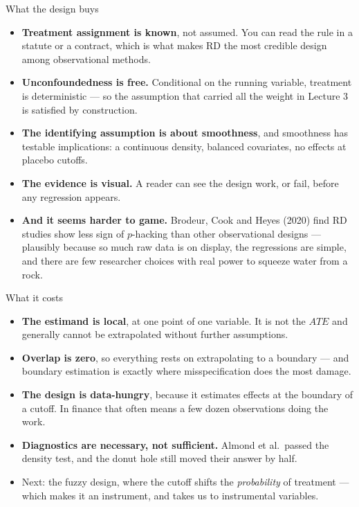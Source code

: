 \documentclass[
  11pt,
  ignorenonframetext,
  aspectratio=169,
]{beamer}
\providecommand{\tightlist}{%
  \setlength{\itemsep}{0pt}\setlength{\parskip}{0pt}}
\begin{document}
\begin{frame}{What the design buys}
\protect{}\label{what-the-design-buys}
\begin{itemize}
\tightlist
\item
  \textbf{Treatment assignment is known}, not assumed. You can read the
  rule in a statute or a contract, which is what makes RD the most
  credible design among observational methods.
\item
  \textbf{Unconfoundedness is free.} Conditional on the running
  variable, treatment is deterministic --- so the assumption that
  carried all the weight in Lecture 3 is satisfied by construction.
\item
  \textbf{The identifying assumption is about smoothness}, and
  smoothness has testable implications: a continuous density, balanced
  covariates, no effects at placebo cutoffs.
\item
  \textbf{The evidence is visual.} A reader can see the design work, or
  fail, before any regression appears.
\item
  \textbf{And it seems harder to game.} Brodeur, Cook and Heyes (2020)
  find RD studies show less sign of \(p\)-hacking than other
  observational designs --- plausibly because so much raw data is on
  display, the regressions are simple, and there are few researcher
  choices with real power to squeeze water from a rock.
\end{itemize}
\end{frame}

\begin{frame}{What it costs}
\protect{}\label{what-it-costs}
\begin{itemize}
\tightlist
\item
  \textbf{The estimand is local}, at one point of one variable. It is
  not the \(ATE\) and generally cannot be extrapolated without further
  assumptions.
\item
  \textbf{Overlap is zero}, so everything rests on extrapolating to a
  boundary --- and boundary estimation is exactly where misspecification
  does the most damage.
\item
  \textbf{The design is data-hungry}, because it estimates effects at
  the boundary of a cutoff. In finance that often means a few dozen
  observations doing the work.
\item
  \textbf{Diagnostics are necessary, not sufficient.} Almond et
  al.~passed the density test, and the donut hole still moved their
  answer by half.
\item
  Next: the fuzzy design, where the cutoff shifts the \emph{probability}
  of treatment --- which makes it an instrument, and takes us to
  instrumental variables.
\end{itemize}
\end{frame}
\end{document}

